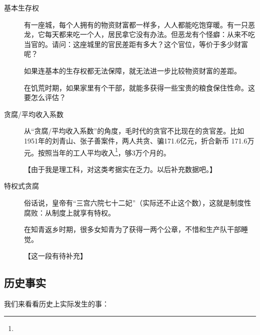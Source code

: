 \begin{description}
\item[基本生存权] 有一座城，每个人拥有的物资财富都一样多，人人都能吃饱穿暖。有一只恶龙，它每天都来吃一个人，居民拿它没有办法。但恶龙有个怪癖：从来不吃当官的。请问：这座城里的官民差距有多大？这个官位，等价于多少财富呢？

如果连基本的生存权都无法保障，就无法进一步比较物资财富的差距。

在饥荒时期，如果家里有个干部，就能多获得一些宝贵的粮食保住性命。这要怎么评估？

\item[贪腐/平均收入系数]
从“贪腐/平均收入系数”的角度，毛时代的贪官不比现在的贪官差。比如1951年的刘青山、张子善案件，两人共贪、骗171.6亿元，折合新币 171.6万元。按照当年的工人平均收入\footnote{}，够3万个月的。

【由于我是理工科，对这类考据实在乏力。以后补充数据吧。】

\item[特权式贪腐]

俗话说，皇帝有“三宫六院七十二妃”（实际还不止这个数），这就是制度性腐败：从制度上就享有特权。

在知青返乡时期，很多女知青为了获得一两个公章，不惜和生产队干部睡觉。

【这一段有待补充】
\end{description}

\subsection{历史事实}

我们来看看历史上实际发生的事：

